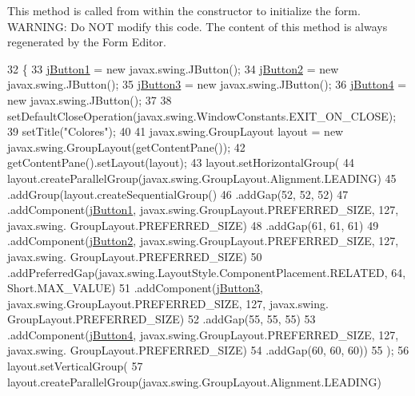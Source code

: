 This method is called from within the constructor to initialize the form. W\+A\+R\+N\+I\+NG\+: Do N\+OT modify this code. The content of this method is always regenerated by the Form Editor. 
\begin{DoxyCode}
32     \{ 
33         \mbox{\hyperlink{class_ejercicio3_1_1_ventana_a78dd8dc5e6b6a1d1558465cafa164556}{jButton1}} = \textcolor{keyword}{new} javax.swing.JButton();
34         \mbox{\hyperlink{class_ejercicio3_1_1_ventana_a79e68bd221077efe89ad7a79052bc1a7}{jButton2}} = \textcolor{keyword}{new} javax.swing.JButton();
35         \mbox{\hyperlink{class_ejercicio3_1_1_ventana_ac44e593863c65fac1c8ce056ce552be6}{jButton3}} = \textcolor{keyword}{new} javax.swing.JButton();
36         \mbox{\hyperlink{class_ejercicio3_1_1_ventana_aa96e8c70f82bc835f2218641fd1b0649}{jButton4}} = \textcolor{keyword}{new} javax.swing.JButton();
37  
38         setDefaultCloseOperation(javax.swing.WindowConstants.EXIT\_ON\_CLOSE);
39         setTitle(\textcolor{stringliteral}{"Colores"});
40  
41         javax.swing.GroupLayout layout = \textcolor{keyword}{new} javax.swing.GroupLayout(getContentPane());
42         getContentPane().setLayout(layout);
43         layout.setHorizontalGroup(
44             layout.createParallelGroup(javax.swing.GroupLayout.Alignment.LEADING)
45             .addGroup(layout.createSequentialGroup()
46                 .addGap(52, 52, 52)
47                 .addComponent(\mbox{\hyperlink{class_ejercicio3_1_1_ventana_a78dd8dc5e6b6a1d1558465cafa164556}{jButton1}}, javax.swing.GroupLayout.PREFERRED\_SIZE, 127, javax.swing.
      GroupLayout.PREFERRED\_SIZE)
48                 .addGap(61, 61, 61)
49                 .addComponent(\mbox{\hyperlink{class_ejercicio3_1_1_ventana_a79e68bd221077efe89ad7a79052bc1a7}{jButton2}}, javax.swing.GroupLayout.PREFERRED\_SIZE, 127, javax.swing.
      GroupLayout.PREFERRED\_SIZE)
50                 .addPreferredGap(javax.swing.LayoutStyle.ComponentPlacement.RELATED, 64, Short.MAX\_VALUE)
51                 .addComponent(\mbox{\hyperlink{class_ejercicio3_1_1_ventana_ac44e593863c65fac1c8ce056ce552be6}{jButton3}}, javax.swing.GroupLayout.PREFERRED\_SIZE, 127, javax.swing.
      GroupLayout.PREFERRED\_SIZE)
52                 .addGap(55, 55, 55)
53                 .addComponent(\mbox{\hyperlink{class_ejercicio3_1_1_ventana_aa96e8c70f82bc835f2218641fd1b0649}{jButton4}}, javax.swing.GroupLayout.PREFERRED\_SIZE, 127, javax.swing.
      GroupLayout.PREFERRED\_SIZE)
54                 .addGap(60, 60, 60))
55         );
56         layout.setVerticalGroup(
57             layout.createParallelGroup(javax.swing.GroupLayout.Alignment.LEADING)

\end{DoxyCode}
